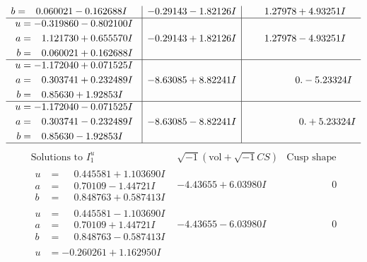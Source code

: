 \documentclass[1p]{elsarticle_modified}
\theoremstyle{definition}
\newcommand{\I}{\sqrt{-1}}
\begin{document}
$$\begin{array}{c|c|c}
\begin{aligned}
b &= \phantom{-}0.060021 - 0.162688 I\end{aligned}
 & -0.29143 - 1.82126 I & \phantom{-}1.27978 + 4.93251 I \\ \hline\begin{aligned}
u &= -0.319860 - 0.802100 I \\
a &= \phantom{-}1.121730 + 0.655570 I \\
b &= \phantom{-}0.060021 + 0.162688 I\end{aligned}
 & -0.29143 + 1.82126 I & \phantom{-}1.27978 - 4.93251 I \\ \hline\begin{aligned}
u &= -1.172040 + 0.071525 I \\
a &= \phantom{-}0.303741 + 0.232489 I \\
b &= \phantom{-}0.85630 + 1.92853 I\end{aligned}
 & -8.63085 + 8.82241 I & \phantom{-0.000000 } 0. - 5.23324 I \\ \hline\begin{aligned}
u &= -1.172040 - 0.071525 I \\
a &= \phantom{-}0.303741 - 0.232489 I \\
b &= \phantom{-}0.85630 - 1.92853 I\end{aligned}
 & -8.63085 - 8.82241 I & \phantom{-0.000000 -}0. + 5.23324 I\\
 \hline 
 \end{array}$$\newpage$$\begin{array}{c|c|c}  
\text{Solutions to }I^u_{1}& \I (\text{vol} + \sqrt{-1}CS) & \text{Cusp shape}\\
 \hline 
\begin{aligned}
u &= \phantom{-}0.445581 + 1.103690 I \\
a &= \phantom{-}0.70109 - 1.44721 I \\
b &= \phantom{-}0.848763 + 0.587413 I\end{aligned}
 & -4.43655 + 6.03980 I & \phantom{-0.000000 } 0 \\ \hline\begin{aligned}
u &= \phantom{-}0.445581 - 1.103690 I \\
a &= \phantom{-}0.70109 + 1.44721 I \\
b &= \phantom{-}0.848763 - 0.587413 I\end{aligned}
 & -4.43655 - 6.03980 I & \phantom{-0.000000 } 0 \\ \hline\begin{aligned}
u &= -0.260261 + 1.162950 I \\

\end{aligned}
\end{array}$$
\end{document}
